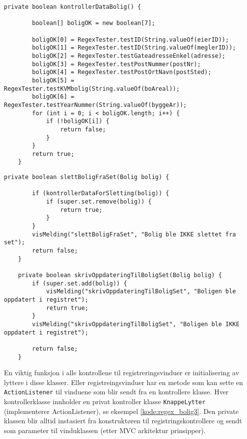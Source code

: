 \begin{lstlisting}[caption=\texttt{ControllerRegistrerBolig.java}: Regex test av generelle tekstfelt for bolig.,label=kode:regex_bolig]
    private boolean kontrollerDataBolig() {
    
        boolean[] boligOK = new boolean[7];

        boligOK[0] = RegexTester.testID(String.valueOf(eierID));
        boligOK[1] = RegexTester.testID(String.valueOf(meglerID));
        boligOK[2] = RegexTester.testGateadresseEnkel(adresse);
        boligOK[3] = RegexTester.testPostNummer(postNr);
        boligOK[4] = RegexTester.testPostOrtNavn(postSted);
        boligOK[5] = RegexTester.testKVMbolig(String.valueOf(boAreal));
        boligOK[6] = RegexTester.testYearNummer(String.valueOf(byggeAr));
        for (int i = 0; i < boligOK.length; i++) {
            if (!boligOK[i]) {
                return false;
            }
        }
        return true;
    }
\end{lstlisting}


\begin{lstlisting}[caption=\texttt{ControllerRegistrerBolig.java}: Sletting og oppdatering av samme bolig objekt via superklassen til kontrolleren.,label=kode:regex_bolig2]
    private boolean slettBoligFraSet(Bolig bolig) {

        if (kontrollerDataForSletting(bolig)) {
            if (super.set.remove(bolig)) {
                return true;
            }
        }
        visMelding("slettBoligFraSet", "Bolig ble IKKE slettet fra set");
        return false;
    }
    
    private boolean skrivOppdateringTilBoligSet(Bolig bolig) {
        if (super.set.add(bolig)) {
            visMelding("skrivOppdateringTilBoligSet", "Boligen ble oppdatert i registret");
            return true;
        }
        visMelding("skrivOppdateringTilBoligSet", "Boligen ble IKKE oppdatert i registret");

        return false;
    }
\end{lstlisting}

En viktig funksjon i alle kontrollene til registreringsvinduer er initialisering av lyttere i disse klasser. Eller registreingsvinduer har en metode som kan sette en \texttt{ActionListener} til vinduene som blir sendt fra en kontrollere klasse. Hver kontrollerklasse innholder en privat kontroller klasse \texttt{KnappeLytter} (implementerer ActionListener), se eksempel \ref{kode:regex_bolig3}. Den private klassen blir alltid instasiert fra konstruktøren til registringskontrollere og sendt som parameter til vinduklassen (etter MVC arkitektur prinsipper).

